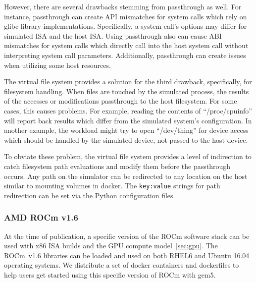 However, there are several drawbacks stemming from passthrough as well.
For instance, passthrough can create API mismatches for system calls which rely on glibc library implementations. Specifically, a system call's options may differ for simulated ISA and the host ISA.
Using passthrough also can cause ABI mismatches for system calls which directly call into the host system call without interpreting system call parameters.
Additionally, passthrough can create issues when utilizing some host resources.

The virtual file system provides a solution for the third drawback, specifically, for filesystem handling.
When files are touched by the simulated process, the results of the accesses or modifications passthrough to the host filesystem.
For some cases, this causes problems.
For example, reading the contents of ``/proc/cpuinfo'' will report back results which differ from the simulated system's configuration.
In another example, the workload might try to open ``/dev/thing'' for device access which should be handled by the simulated device, not passed to the host device.

To obviate these problem, the virtual file system provides a level of indirection to catch filesystem path evaluations and modify them before the passthrough occurs.
Any path on the simulator can be redirected to any location on the host similar to mounting volumes in docker.
The \lstinline|key:value| strings for path redirection can be set via the Python configuration files.

\subsubsection{AMD ROCm v1.6}

At the time of publication, a specific version of the ROCm software stack can be used with x86 ISA builds and the GPU compute model~\ref{sec:gpu}.
The ROCm~v1.6 libraries can be loaded and used on both RHEL6 and Ubuntu 16.04 operating systems.
We distribute a set of docker containers and dockerfiles to help users get started using this specific version of ROCm with gem5.
